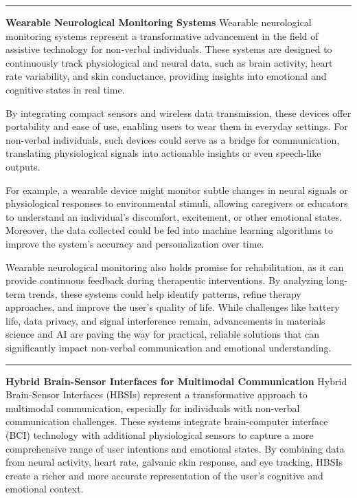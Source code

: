 \documentclass[12pt, research paper]{report}
\begin{document}
	\noindent \rule{13.85cm}{0.01cm}
	\textbf{Wearable Neurological Monitoring Systems}
	\newline Wearable neurological monitoring systems represent a transformative advancement in the field of assistive technology for non-verbal individuals. These systems are designed to continuously track physiological and neural data, such as brain activity, heart rate variability, and skin conductance, providing insights into emotional and cognitive states in real time.
	\bigskip 
	
	\noindent By integrating compact sensors and wireless data transmission, these devices offer portability and ease of use, enabling users to wear them in everyday settings. For non-verbal individuals, such devices could serve as a bridge for communication, translating physiological signals into actionable insights or even speech-like outputs.
	\bigskip 
	
	\noindent For example, a wearable device might monitor subtle changes in neural signals or physiological responses to environmental stimuli, allowing caregivers or educators to understand an individual's discomfort, excitement, or other emotional states. Moreover, the data collected could be fed into machine learning algorithms to improve the system's accuracy and personalization over time.
	\bigskip 
	
	\noindent Wearable neurological monitoring also holds promise for rehabilitation, as it can provide continuous feedback during therapeutic interventions. By analyzing long-term trends, these systems could help identify patterns, refine therapy approaches, and improve the user’s quality of life. While challenges like battery life, data privacy, and signal interference remain, advancements in materials science and AI are paving the way for practical, reliable solutions that can significantly impact non-verbal communication and emotional understanding.
	
	\noindent \rule{13.85cm}{0.01cm}
	\textbf{Hybrid Brain-Sensor Interfaces for Multimodal Communication}
	\newline Hybrid Brain-Sensor Interfaces (HBSIs) represent a transformative approach to multimodal communication, especially for individuals with non-verbal communication challenges. These systems integrate brain-computer interface (BCI) technology with additional physiological sensors to capture a more comprehensive range of user intentions and emotional states. By combining data from neural activity, heart rate, galvanic skin response, and eye tracking, HBSIs create a richer and more accurate representation of the user's cognitive and emotional context.
	\bigskip 
	
\end{document}
